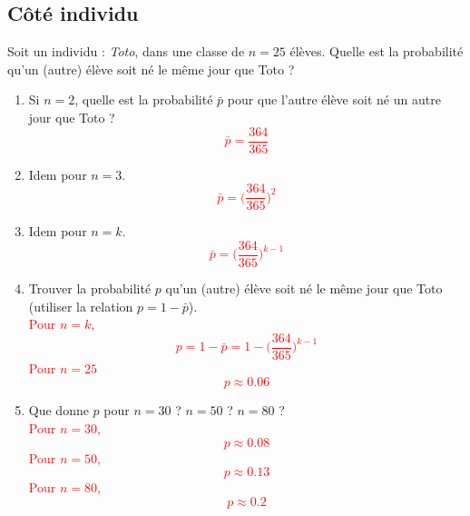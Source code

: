 \subsection{Côté individu}
Soit un individu : \textit{Toto}, dans une classe de $n=25$ élèves.
Quelle est la probabilité qu'un (autre) élève soit né le même jour que Toto ?

\begin{enumerate}
	\item Si $n=2$, quelle est la probabilité $\bar{p}$ pour que l'autre élève
	soit né un autre jour que Toto ?
	\textcolor{red}{
		$$\bar{p} = \frac{364}{365}$$
	}
	
	\item Idem pour $n=3$.
	\textcolor{red}{
		$$\bar{p} = \Big(\frac{364}{365} \Big)^2$$
	}
	
	\item Idem pour $n=k$.
	\textcolor{red}{
		$$\bar{p} = \Big(\frac{364}{365} \Big)^{k-1}$$
	}
	
	\item Trouver la probabilité $p$ 
	qu'un (autre) élève soit né le même jour que Toto 
	(utiliser la relation $p = 1-\bar{p}$).
	\textcolor{red}{
	\\
	Pour $n = k$, 
		$$
		p = 1 - \bar{p}
		= 1 - \Big(\frac{364}{365} \Big)^{k-1}
		$$
		Pour $n=25$
		$$
		p \approx 0.06
		$$
	}
	
	\item Que donne $p$ pour $n=30$ ? $n=50$ ? $n=80$ ?
	\textcolor{red}{
		\\
		Pour $n=30$,
		$$ p \approx 0.08$$
		Pour $n=50$,
		$$ p \approx 0.13$$
		Pour $n=80$,
		$$ p \approx 0.2$$
	}
	
\end{enumerate}

